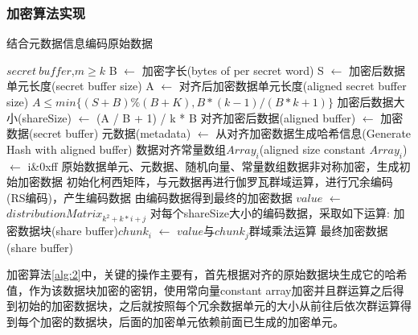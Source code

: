 \subsubsection{加密算法实现}
 \begin{algorithm}[htb]
     \caption{结合元数据信息编码原始数据}
 	\label{alg:2}
 	\begin{algorithmic}
 		\REQUIRE $secret\ buffer$,$m \ge k$
        \STATE B $\gets$ 加密字长(bytes of per secret word)
        \STATE S $\gets$ 加密后数据单元长度(secret buffer size)
        \STATE A $\gets$ 对齐后加密数据单元长度(aligned secret buffer size)
 		\ENSURE $A \le min\{(S+B) \% (B+K), B*(k-1) / (B*k+1)\}$
        \STATE 加密后数据大小(shareSize) $\gets$ (A / B + 1) / k * B
        \STATE 对齐加密后数据(aligned buffer) $\gets$ 加密数据(secret buffer)
        \STATE 元数据(metadata) $\gets$ 从对齐加密数据生成哈希信息(Generate Hash with aligned buffer)
        \STATE 数据对齐常量数组$Array_i$(aligned size constant $Array_i$) $\gets$ i\&0xff
 		\ENDFOR
        \STATE 原始数据单元、元数据、随机向量、常量数组数据非对称加密，生成初始加密数据%
        \STATE 初始化柯西矩阵，与元数据再进行伽罗瓦群域运算，进行冗余编码(RS编码)，产生编码数据%
        \STATE 由编码数据得到最终的加密数据%
 		\STATE $value$ $\gets$ $distributionMatrix_{k^2+k*i+j}$
 		\STATE
        对每个shareSize大小的编码数据，采取如下运算:
        加密数据块(share buffer)$chunk_i$ $\gets$ $value$与$chunk_j$群域乘法运算%
 		\ENDFOR
 		\ENDFOR
        \RETURN 最终加密数据(share buffer)
 	\end{algorithmic}
 \end{algorithm}
加密算法\autoref{alg:2}中，关键的操作主要有，首先根据对齐的原始数据块生成它的哈希值，作为该数据块加密的密钥，使用常向量constant array加密并且群运算之后得到初始的加密数据块，之后就按照每个冗余数据单元的大小从前往后依次群运算得到每个加密的数据块，后面的加密单元依赖前面已生成的加密单元。
